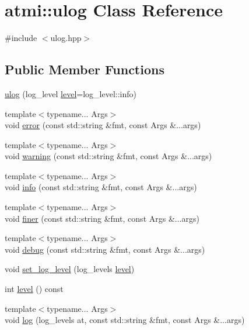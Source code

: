 \hypertarget{classatmi_1_1ulog}{}\section{atmi\+:\+:ulog Class Reference}
\label{classatmi_1_1ulog}


{\ttfamily \#include $<$ulog.\+hpp$>$}

\subsection*{Public Member Functions}
\begin{DoxyCompactItemize}
\item 
\hyperlink{classatmi_1_1ulog_a52394015e2bcd098c9b6de0e173637e9}{ulog} (log\+\_\+level \hyperlink{classatmi_1_1ulog_a75c3bf9fdf68677f5e2b096acdac737e}{level}=log\+\_\+level\+::info)
\item 
{\footnotesize template$<$typename... Args$>$ }\\void \hyperlink{classatmi_1_1ulog_a29e7f8215085533c0b4fb788545e9329}{error} (const std\+::string \&fmt, const Args \&...args)
\item 
{\footnotesize template$<$typename... Args$>$ }\\void \hyperlink{classatmi_1_1ulog_a48f44bc3d0265fdb3b8d464b78894ccc}{warning} (const std\+::string \&fmt, const Args \&...args)
\item 
{\footnotesize template$<$typename... Args$>$ }\\void \hyperlink{classatmi_1_1ulog_a21019f39119ed09e7d71672441456787}{info} (const std\+::string \&fmt, const Args \&...args)
\item 
{\footnotesize template$<$typename... Args$>$ }\\void \hyperlink{classatmi_1_1ulog_a23b79b2222930f4363d3150c39b49992}{finer} (const std\+::string \&fmt, const Args \&...args)
\item 
{\footnotesize template$<$typename... Args$>$ }\\void \hyperlink{classatmi_1_1ulog_a96d76b04d41c2a77a4c88e5d422ea5e5}{debug} (const std\+::string \&fmt, const Args \&...args)
\item 
void \hyperlink{classatmi_1_1ulog_a190ffba6f15d00c21578051ac5c7b035}{set\+\_\+log\+\_\+level} (log\+\_\+levels \hyperlink{classatmi_1_1ulog_a75c3bf9fdf68677f5e2b096acdac737e}{level})
\item 
int \hyperlink{classatmi_1_1ulog_a75c3bf9fdf68677f5e2b096acdac737e}{level} () const 
\item 
{\footnotesize template$<$typename... Args$>$ }\\void \hyperlink{classatmi_1_1ulog_ad352992adc121dbdaf0428fd6f53125a}{log} (log\+\_\+levels at, const std\+::string \&fmt, const Args \&...args)
\end{DoxyCompactItemize}


